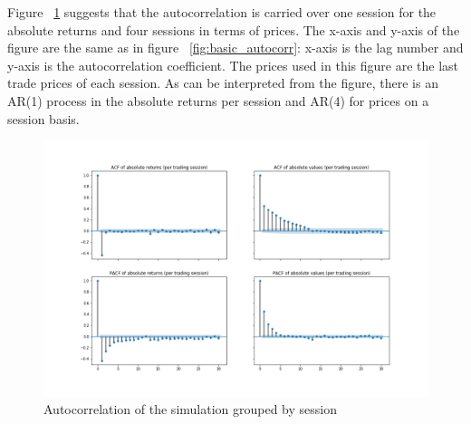 Figure ~\ref{fig:basic_autocorr_per_session} suggests that the autocorrelation is carried over one
session for the absolute returns and four sessions in terms of prices. The x-axis and y-axis of the figure are the same as 
in figure ~\ref{fig:basic_autocorr}: x-axis is the lag number and y-axis is the autocorrelation coefficient. 
The prices used in this figure are the last trade prices of each session. As can be interpreted from the figure, there is an AR(1) process in 
the absolute returns per session and AR(4) for prices on a session basis.

\begin{figure}[H]
    \includegraphics[width=\linewidth]{plots/basic_autocorrelation.png}
    \caption{Autocorrelation of the simulation grouped by session}
    \label{fig:basic_autocorr_per_session}
\end{figure}



